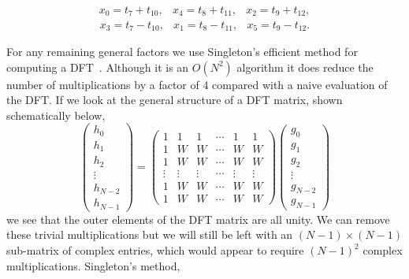 \documentclass[fleqn,12pt]{article}
\begin{document}
\begin{equation}
\begin{array}{lll}
x_0 = t_7 + t_{10}, &
x_4 = t_8 + t_{11}, &
x_2 = t_9 + t_{12}, 
\end{array}
\end{equation}
\begin{equation}
\begin{array}{lll}
x_3 = t_7 - t_{10}, &
x_1 = t_8 - t_{11}, &
x_5 = t_9 - t_{12}.
\end{array}
\end{equation}

For any remaining general factors we use Singleton's efficient method
for computing a DFT~\cite{singleton}. Although it is an $O(N^2)$
algorithm it does reduce the number of multiplications by a factor of
4 compared with a naive evaluation of the DFT. If we look at the
general structure of a DFT matrix, shown schematically below,
%
\begin{equation}
\left(
\begin{array}{c}
h_0 \\
h_1 \\
h_2 \\
\vdots \\
h_{N-2} \\
h_{N-1}
\end{array}
\right)
=
\left(
\begin{array}{cccccc}
1 & 1 & 1 & \cdots & 1 & 1 \\
1 & W & W & \cdots & W & W \\
1 & W & W & \cdots & W & W \\
\vdots & \vdots & \vdots & \cdots & \vdots & \vdots \\
1 & W & W & \cdots & W & W \\
1 & W & W & \cdots & W & W 
\end{array}
\right)
\left(
\begin{array}{c}
g_0 \\
g_1 \\
g_2 \\
\vdots \\
g_{N-2} \\
g_{N-1}
\end{array}
\right)
\end{equation}
%
we see that the outer elements of the DFT matrix are all unity. We can
remove these trivial multiplications but we will still be left with an
$(N-1) \times (N-1)$ sub-matrix of complex entries, which would appear
to require $(N-1)^2$ complex multiplications.  Singleton's method,
\end{document}
